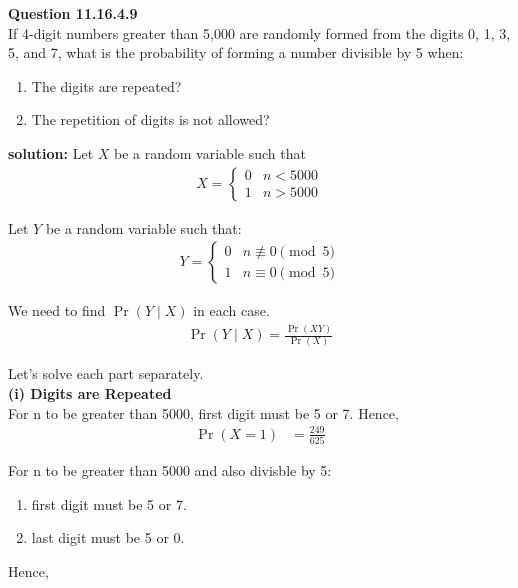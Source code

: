 \documentclass{article}
\begin{document}
\providecommand{\pr}[1]{\ensuremath{\Pr\left(#1\right)}}
\providecommand{\brak}[1]{\ensuremath{\left(#1\right)}}
\newcommand{\solution}{\noindent \textbf{solution: }}

\textbf{Question 11.16.4.9}\\
If 4-digit numbers greater than 5,000 are randomly formed from the digits 0, 1, 3, 5, and 7, what is the probability of forming a number divisible by 5 when:
\begin{enumerate}
    \item The digits are repeated?
    \item The repetition of digits is not allowed?
\end{enumerate}

\solution
Let $X$ be a random variable such that 
\begin{align}
	X = \begin{cases}
		0 &  n<5000\\
		1 &  n>5000\end{cases}
\end{align}

Let $Y$ be a random variable such that:
\begin{align}
	Y = \begin{cases}
		0 & n \not\equiv 0 \pmod{5}\\
		1 & n \equiv 0 \pmod{5}\end{cases}
\end{align}

We need to find \pr{Y \mid X} in each case. \\

\begin{align}
	\pr{Y \mid X}=\frac{\pr{XY} }{\pr{X}}
\end{align}

Let's solve each part separately. \\

\textbf{(i) Digits are Repeated}\\
For n to be greater than 5000, first digit must be 5 or 7. Hence,
\begin{align}
	\pr{X=1} &=\frac{249}{625}
\end{align}

For n to be greater than 5000 and also divisble by 5:
\begin{enumerate}
\item first digit must be 5 or 7.
\item last digit must be 5 or 0.
\end{enumerate}
Hence,
\end{document}
